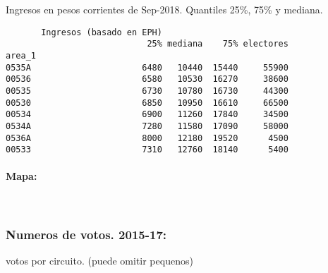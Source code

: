 \documentclass[11pt]{article}
\begin{document}
    
    Ingresos en pesos corrientes de Sep-2018. Quantiles 25\%, 75\% y
mediana.

    
    
    \begin{verbatim}
       Ingresos (basado en EPH)                         
                            25% mediana    75% electores
area_1                                                  
0535A                      6480   10440  15440     55900
00536                      6580   10530  16270     38600
00535                      6730   10780  16730     44300
00530                      6850   10950  16610     66500
00534                      6900   11260  17840     34500
0534A                      7280   11580  17090     58000
0536A                      8000   12180  19520      4500
00533                      7310   12760  18140      5400
    \end{verbatim}

    
    \hypertarget{mapa}{%
\paragraph{Mapa:}\label{mapa}}

    
    \begin{center}
    \end{center}
    { \hspace*{\fill} \\}
    
    \hypertarget{numeros-de-votos.-2015-17}{%
\subsubsection{Numeros de votos.
2015-17:}\label{numeros-de-votos.-2015-17}}

    
    votos por circuito. (puede omitir pequenos)

    
    
\end{document}
